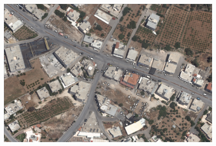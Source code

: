 \documentclass[]{article}
\begin{document}
\begin{figure}[!h]
\centering
\includegraphics[width=1\linewidth]{"images/im3"}
\end{figure}
\end{document}
